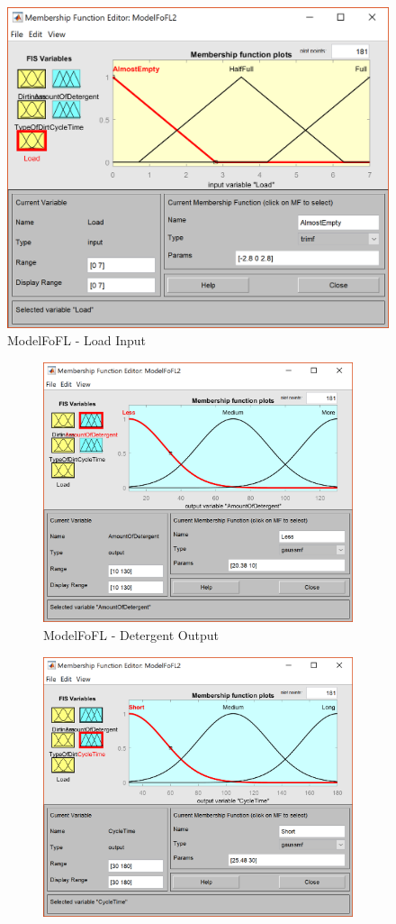 \documentclass[11pt]{article}
\begin{document}
\begin{enumerate}[label=(\alph*)]
  \begin{figure}[ht!]
    \centering
    \includegraphics[width=.45\linewidth]{res/image3_load}
    \caption{ModelFoFL - Load Input}
    \label{fig:sub2}
  \end{figure}

  \begin{figure}[ht!]
  \centering
  \begin{subfigure}{.5\textwidth}
    \centering
    \includegraphics[width=.9\linewidth]{res/image3_detergent}
    \caption{ModelFoFL - Detergent Output}
    \label{fig:sub1}
  \end{subfigure}%
  \begin{subfigure}{.5\textwidth}
    \centering
    \includegraphics[width=.9\linewidth]{res/image3_cycletime}

\end{subfigure}
\end{figure}
\end{enumerate}
\end{document}
